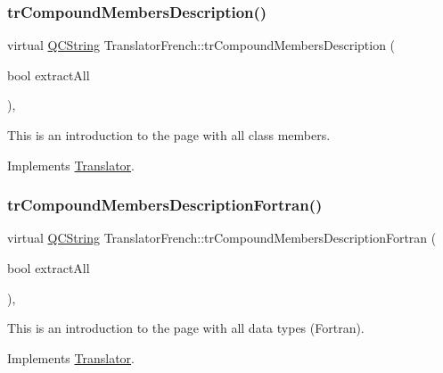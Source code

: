 \subsubsection{\texorpdfstring{trCompoundMembersDescription()}{trCompoundMembersDescription()}}
{\footnotesize\ttfamily virtual \mbox{\hyperlink{class_q_c_string}{Q\+C\+String}} Translator\+French\+::tr\+Compound\+Members\+Description (\begin{DoxyParamCaption}\item[{bool}]{extract\+All }\end{DoxyParamCaption})\hspace{0.3cm}{\ttfamily [inline]}, {\ttfamily [virtual]}}

This is an introduction to the page with all class members. 

Implements \mbox{\hyperlink{class_translator}{Translator}}.

\mbox{\label{class_translator_french_a232b078b3abef962939d19f016cebb59}} 
\subsubsection{\texorpdfstring{trCompoundMembersDescriptionFortran()}{trCompoundMembersDescriptionFortran()}}
{\footnotesize\ttfamily virtual \mbox{\hyperlink{class_q_c_string}{Q\+C\+String}} Translator\+French\+::tr\+Compound\+Members\+Description\+Fortran (\begin{DoxyParamCaption}\item[{bool}]{extract\+All }\end{DoxyParamCaption})\hspace{0.3cm}{\ttfamily [inline]}, {\ttfamily [virtual]}}

This is an introduction to the page with all data types (Fortran). 

Implements \mbox{\hyperlink{class_translator}{Translator}}.

\mbox{\label{class_translator_french_a3d6981f7020e14b52031fb7f40bd75cc}} 
